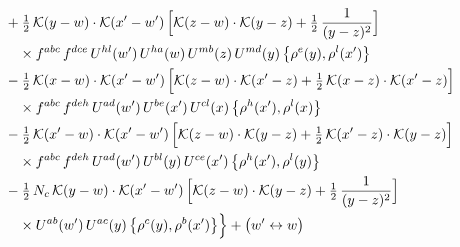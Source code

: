 \documentclass[10pt]{article}
\numberwithin{equation}{section}
\newcommand{\KK}{\mathcal K}
\begin{document}
\begin{align}
&\quad +\tfrac12\,\KK(y-w)\cdot\KK(x'-w')\,\Big[\KK(z-w)\cdot\KK(y-z)+\tfrac12\,\frac{1}{(y-z)^2}\Big]\notag\\
&\qquad\times f^{abc}\,f^{dce}\,U^{hl}(w')\,U^{ha}(w)\,U^{mb}(z)\,U^{md}(y)\,\big\{\rho^{e}(y),\rho^{l}(x')\big\}\notag\\
&\quad -\tfrac12\,\KK(x-w)\cdot\KK(x'-w')\,\Big[\KK(z-w)\cdot\KK(x'-z)+\tfrac12\,\KK(x-z)\cdot\KK(x'-z)\Big]\notag\\
&\qquad\times f^{abc}\,f^{deh}\,U^{ad}(w')\,U^{be}(x')\,U^{cl}(x)\,\big\{\rho^{h}(x'),\rho^{l}(x)\big\}\notag\\
&\quad -\tfrac12\,\KK(x'-w)\cdot\KK(x'-w')\,\Big[\KK(z-w)\cdot\KK(y-z)+\tfrac12\,\KK(x'-z)\cdot\KK(y-z)\Big]\notag\\
&\qquad\times f^{abc}\,f^{deh}\,U^{ad}(w')\,U^{bl}(y)\,U^{ce}(x')\,\big\{\rho^{h}(x'),\rho^{l}(y)\big\}\notag\\
&\quad -\tfrac12\,N_{c}\,\KK(y-w)\cdot\KK(x'-w')\,\Big[\KK(z-w)\cdot\KK(y-z)+\tfrac12\,\frac{1}{(y-z)^2}\Big]\notag\\
&\qquad\times U^{ab}(w')\,U^{ac}(y)\,\big\{\rho^{c}(y),\rho^{b}(x')\big\}\Big\}+\big(w'\leftrightarrow w\big)\label{eq:sum-GI.IV}
\end{align}
\end{document}
